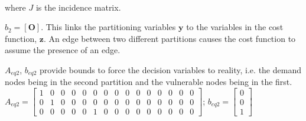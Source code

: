 \documentclass[authoryear,preprint,review,12pt]{elsarticle}
\begin{document}
	\\

 where $J$ is the incidence matrix.

$b_{2}=\left[\mathbf{O}\right]$. This links the partitioning variables
$\mathbf{y}$ to the variables in the cost function, $\mathbf{z}$.
An edge between two different partitions causes the cost function
to assume the presence of an edge.

$A_{eq2}$, $b_{eq2}$ provide bounds to force the decision variables
to reality, i.e. the demand nodes being in the second partition and the vulnerable nodes being in the first. \\

$A_{eq2}=\left[\begin{array}{ccccccccccccccc}
1 & 0 & 0 & 0 & 0 & 0 & 0 & 0 & 0 & 0 & 0 & 0 & 0 & 0 & 0\\
0 & 1 & 0 & 0 & 0 & 0 & 0 & 0 & 0 & 0 & 0 & 0 & 0 & 0 & 0\\
0 & 0 & 0 & 0 & 0 & 1 & 0 & 0 & 0 & 0 & 0 & 0 & 0 & 0 & 0
\end{array}\right]$; $b_{eq2}=\left[\begin{array}{c}
0\\
0\\
1
\end{array}\right]$\\
\end{document}
